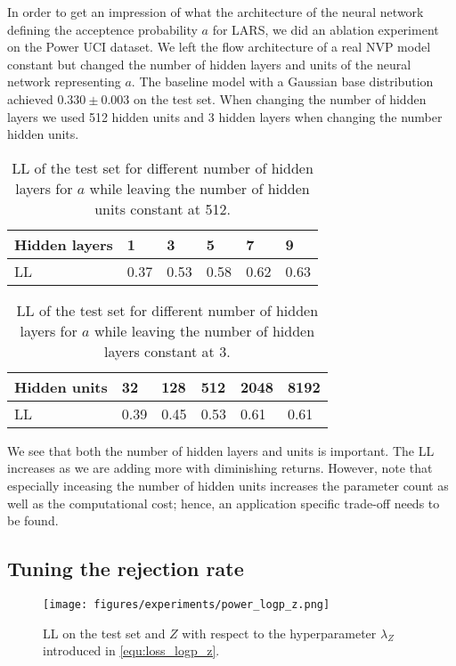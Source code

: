 \documentclass[twoside]{article}
\begin{document}
In order to get an impression of what the architecture of the neural network defining the acceptence probability $a$ for LARS, we did an ablation experiment on the Power UCI dataset. We left the flow architecture of a real NVP model constant but changed the number of hidden layers and units of the neural network representing $a$. The baseline model with a Gaussian base distribution achieved $0.330\pm0.003$ on the test set. When changing the number of hidden layers we used 512 hidden units and 3 hidden layers when changing the number hidden units.

\begin{table}[h]
    \centering
    \caption{LL of the test set for different number of hidden layers for $a$ while leaving the number of hidden units constant at 512.}
    \label{tab:abl_hl}
    \begin{tabular}{l|lllll}
         Hidden layers & 1 & 3 & 5 & 7 & 9 \\
         \hline
         LL & 0.37 & 0.53 & 0.58 & 0.62 & 0.63 
    \end{tabular}
\end{table}

\begin{table}[h]
    \centering
    \caption{LL of the test set for different number of hidden layers for $a$ while leaving the number of hidden layers constant at 3.}
    \label{tab:abl_hl}
    \begin{tabular}{l|lllll}
         Hidden units & 32 & 128 & 512 & 2048 & 8192 \\
         \hline
         LL & 0.39 & 0.45 & 0.53 & 0.61 & 0.61
    \end{tabular}
\end{table}

We see that both the number of hidden layers and units is important. The LL increases as we are adding more with diminishing returns. However, note that especially inceasing the number of hidden units increases the parameter count as well as the computational cost; hence, an application specific trade-off needs to be found.


\subsection{Tuning the rejection rate}
\label{sec:a_rejection_rate}

\begin{figure}[h]
    \centering
    \texttt{[image: figures/experiments/power\_logp\_z.png]}
    \caption{LL on the test set and $Z$ with respect to the hyperparameter $\lambda_Z$ introduced in \eqref{equ:loss_logp_z}.}
    \label{fig:power_logp_z}
\end{figure}
\end{document}
